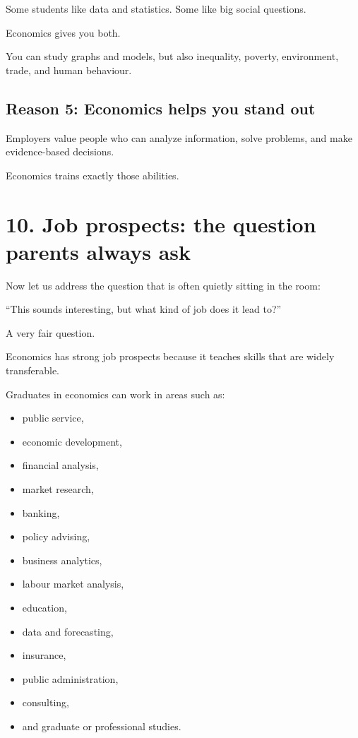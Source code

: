 \documentclass[12pt]{article}
\begin{document}
Some students like data and statistics.  
Some like big social questions.

Economics gives you both.

You can study graphs and models, but also inequality, poverty, environment, trade, and human behaviour.

\subsection*{Reason 5: Economics helps you stand out}

Employers value people who can analyze information, solve problems, and make evidence-based decisions.

Economics trains exactly those abilities.

\section*{10. Job prospects: the question parents always ask}

Now let us address the question that is often quietly sitting in the room:

``This sounds interesting, but what kind of job does it lead to?''

A very fair question.

Economics has strong job prospects because it teaches skills that are widely transferable.

Graduates in economics can work in areas such as:

\begin{itemize}[leftmargin=2em]
    \item public service,
    \item economic development,
    \item financial analysis,
    \item market research,
    \item banking,
    \item policy advising,
    \item business analytics,
    \item labour market analysis,
    \item education,
    \item data and forecasting,
    \item insurance,
    \item public administration,
    \item consulting,
    \item and graduate or professional studies.
\end{itemize}
\end{document}
